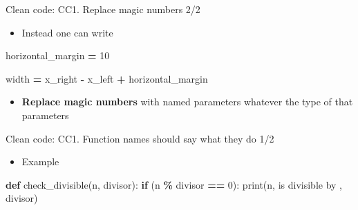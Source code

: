 \documentclass[
  8pt,
  ignorenonframetext,
]{beamer}
\newenvironment{Shaded}{\begin{snugshade}}{\end{snugshade}}
\newcommand{\BuiltInTok}[1]{#1}
\newcommand{\ControlFlowTok}[1]{\textcolor[rgb]{0.13,0.29,0.53}{\textbf{#1}}}
\newcommand{\DecValTok}[1]{\textcolor[rgb]{0.00,0.00,0.81}{#1}}
\newcommand{\KeywordTok}[1]{\textcolor[rgb]{0.13,0.29,0.53}{\textbf{#1}}}
\newcommand{\NormalTok}[1]{#1}
\newcommand{\OperatorTok}[1]{\textcolor[rgb]{0.81,0.36,0.00}{\textbf{#1}}}
\newcommand{\StringTok}[1]{\textcolor[rgb]{0.31,0.60,0.02}{#1}}
\providecommand{\tightlist}{%
  \setlength{\itemsep}{0pt}\setlength{\parskip}{0pt}}
\begin{document}
\begin{frame}[fragile]{Clean code: CC1. Replace magic numbers 2/2}
\protect\hypertarget{clean-code-cc1.-replace-magic-numbers-22}{}
\begin{itemize}
\tightlist
\item
  Instead one can write
\end{itemize}

\begin{Shaded}
\begin{Highlighting}[]
\NormalTok{horizontal\_margin }\OperatorTok{=} \DecValTok{10}

\NormalTok{width }\OperatorTok{=}\NormalTok{ x\_right }\OperatorTok{{-}}\NormalTok{ x\_left }\OperatorTok{+}\NormalTok{ horizontal\_margin}
\end{Highlighting}
\end{Shaded}

\begin{itemize}
\tightlist
\item
  \textbf{Replace magic numbers} with named parameters whatever the type
  of that parameters
\end{itemize}
\end{frame}

\begin{frame}[fragile]{Clean code: CC1. Function names should say what
they do 1/2}
\protect\hypertarget{clean-code-cc1.-function-names-should-say-what-they-do-12}{}
\begin{itemize}
\tightlist
\item
  Example
\end{itemize}

\begin{Shaded}
\begin{Highlighting}[]
\KeywordTok{def}\NormalTok{ check\_divisible(n, divisor):}
    \ControlFlowTok{if}\NormalTok{ (n }\OperatorTok{\%}\NormalTok{ divisor }\OperatorTok{==} \DecValTok{0}\NormalTok{):}
      \BuiltInTok{print}\NormalTok{(n, }\StringTok{\textquotesingle{} is divisible by \textquotesingle{}}\NormalTok{, divisor)}
\end{Highlighting}
\end{Shaded}
\end{frame}
\end{document}

